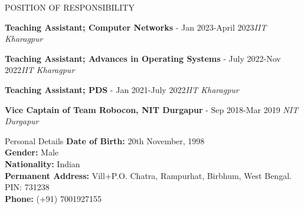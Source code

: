 \documentclass{resume} %
\begin{document}
	\begin{rSection}{POSITION OF RESPONSIBILITY}
		
		{\bf Teaching Assistant; Computer Networks} - Jan 2023-April 2023\hfill {\em IIT Kharagpur}
		
		{\bf Teaching Assistant; Advances in Operating Systems} - July 2022-Nov 2022\hfill {\em IIT Kharagpur}
		
		{\bf Teaching Assistant; PDS} - Jan 2021-July 2022\hfill {\em IIT Kharagpur} 
		
			{\bf Vice Captain of Team Robocon, NIT Durgapur} - Sep 2018-Mar 2019 \hfill {\em NIT Durgapur} 
		
		
	\end{rSection}
	
	\begin{rSection}{Personal Details}
		\textbf{Date of Birth:} 20th November, 1998 \\
		\textbf{Gender:} Male \\ 
		\textbf{Nationality:} Indian\\
		\textbf{Permanent Address:} Vill+P.O. Chatra, Rampurhat, Birbhum, West Bengal. PIN: 731238\\
		\textbf{Phone:} (+91) 7001927155
		
	\end{rSection}
	
\end{document}
